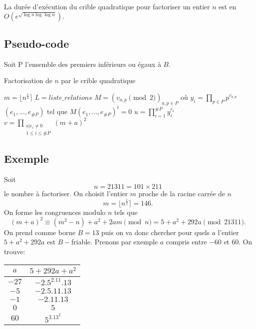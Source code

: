 \documentclass[french, 12pt, titlepage]{article}
\DeclareMathOperator{\pgcd}{pgcd}
\begin{document}
La durée d'exécution du crible quadratique pour factoriser un entier $n$ est en $O(e^{\sqrt{\log n \log \log n}}).$

\subsection{Pseudo-code}
Soit P l'ensemble des premiers inférieurs ou égaux à $B.$

\begin{algorithm}
\caption{Factorisation de $n$ par le crible quadratique}
\BlankLine
$m = \lfloor n^{\frac{1}{2}} \rceil$\;
$L = liste\_relations$\;
$M = (v_{a, p} \pmod 2)_{a, p \in P} \text{ où } y_i = \prod\limits_{p \in P}p^{v_{a,p}}$\;
$(e_1, ..., e_{\#P}) \text{ tel que } M(e_1, ..., e_{\#P})^t = 0$\;
$u = \prod\limits_{i = 1}^{\#P} y_i^{e_i}$\;
$v = \prod\limits_{\substack{a | e_i \neq 0 \\ 1 \leq i \leq \#P}}^{} (m + a)^2$\;
\Return{$\pgcd(u - v, n)$}
\end{algorithm}

\subsection{Exemple}

Soit \[n = 21311 = 101 \times 211\] le nombre à factoriser. On choisit l'entier $m$ proche de la racine carrée de $n$ \[ m = \lfloor n^{\frac{1}{2}} \rceil = 146 .\]
On forme les congruences modulo $n$ tels que \[  (m + a)^2 \equiv (m^2 - n) + a^2 + 2am \pmod n = 5 + a^2 + 292a \pmod{21311} .\]
On prend comme borne $B = 13$ puis on va donc chercher pour quels $a$ l'entier $5 + a^2 + 292a$ est $B-$friable. Prenons par exemple $a$ compris entre $-60$ et $60$.
On trouve:

\begin{center}
\begin{tabular}{c|c}
$a$ & $5 + 292a + a^2$\\
\hline
$-27$ & $-2.5^2.11.13$\\
$ -5$ & $-2.5.11.13$\\
$-1$ & $-2.11.13$\\
$0$ & $5$\\
$60$ & $5^3.13^2$\\
\end{tabular}
\end{center}
\end{document}
